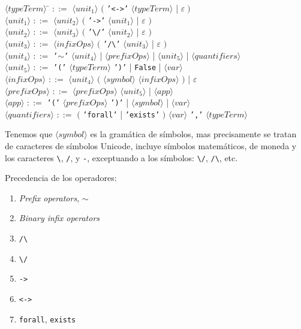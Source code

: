 \documentclass[a4paper,11pt]{article}
\theoremstyle{definition}
\begin{document}
\begin{tabbing}

$\langle typeTerm \rangle$ \hspace{0.3cm} \= $::=$ $\langle unit_{1} \rangle$ $\Big($ \texttt{'<->'} $\langle typeTerm \rangle$ | $\varepsilon \; \Big)$\\
$\langle unit_{1} \rangle$ \> $::=$ $\langle unit_{2} \rangle$ $\Big($ \texttt{'->'} $\langle unit_{1} \rangle$ | $\varepsilon$ $\Big)$ \\
$\langle unit_{2} \rangle$ \> $::=$ $\langle unit_{3} \rangle$ $\Big($ \texttt{'\textbackslash/'} $\langle unit_{2} \rangle$ 
| $\varepsilon$ $\Big)$ \\
$\langle unit_{3} \rangle$ \> $::=$ $\langle infixOps \rangle$ $\Big($ \texttt{'/\textbackslash'} $\langle unit_{3} \rangle$ 
| $\varepsilon$ $\Big)$ \\
$\langle unit_{4} \rangle$ \> $::=$ \texttt{'$\sim$'} $\langle unit_{4} \rangle$ 
| $\langle prefixOps \rangle$ | $\langle unit_{5} \rangle$ | $\langle quantifiers \rangle$\\
$\langle unit_{5} \rangle$ \> $::=$ \texttt{'('} $\langle typeTerm \rangle$ \texttt{')'} | \texttt{False} | $\langle var \rangle$  \\
$\langle infixOps \rangle$ \> $::=$ $\langle unit_{4} \rangle$ $\Big($ $\langle symbol \rangle$ $\langle infixOps \rangle$ $\Big)$ 
| $\varepsilon$\\
$\langle prefixOps \rangle$ \> $::=$ $\langle prefixOps \rangle$ $\langle unit_{5} \rangle$ | $\langle app \rangle$\\
$\langle app \rangle$ \> $::=$ \texttt{'('} $\langle prefixOps \rangle$ \texttt{')'} | $\langle symbol \rangle$ | $\langle var \rangle$ \\
$\langle quantifiers \rangle$ \> $::=$ $\Big($ \texttt{'forall'} | \texttt{'exists'} $\Big)$ $\langle var \rangle$ \texttt{','} $\langle typeTerm \rangle$ \\
\end{tabbing}

Tenemos que $\langle symbol \rangle$ es la gramática de símbolos, mas precisamente se tratan de caracteres de símbolos Unicode, 
incluye símbolos matemáticos, de moneda y los caracteres \texttt{\textbackslash}, \texttt{/}, y \texttt{-}, exceptuando a los
símbolos: \texttt{\textbackslash/}, \texttt{/\textbackslash}, etc.

Precedencia de los operadores:

\begin{enumerate}

\item \textit{Prefix operators}, $\mathtt{\sim}$
\item \textit{Binary infix operators}
\item \texttt{/\textbackslash}
\item \texttt{\textbackslash/}
\item \texttt{->}
\item \texttt{<->}
\item \texttt{forall}, \texttt{exists} 

\end{enumerate}
\end{document}
